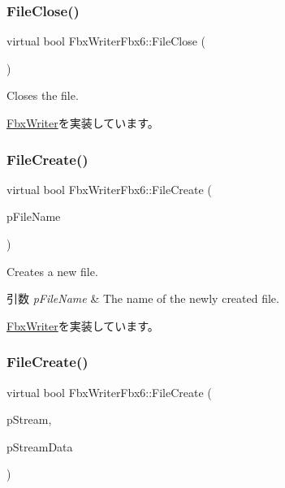 \subsubsection{\texorpdfstring{File\+Close()}{FileClose()}}
{\footnotesize\ttfamily virtual bool Fbx\+Writer\+Fbx6\+::\+File\+Close (\begin{DoxyParamCaption}{ }\end{DoxyParamCaption})\hspace{0.3cm}{\ttfamily [virtual]}}

Closes the file. 

\hyperlink{class_fbx_writer_a0387142f55d0020fd5360759c12aa121}{Fbx\+Writer}を実装しています。

\mbox{\label{class_fbx_writer_fbx6_ae7ad665b515f5896f2263cce0e5f38fc}} 
\subsubsection{\texorpdfstring{File\+Create()}{FileCreate()}\hspace{0.1cm}{\footnotesize\ttfamily [1/2]}}
{\footnotesize\ttfamily virtual bool Fbx\+Writer\+Fbx6\+::\+File\+Create (\begin{DoxyParamCaption}\item[{char $\ast$}]{p\+File\+Name }\end{DoxyParamCaption})\hspace{0.3cm}{\ttfamily [virtual]}}

Creates a new file. 
\begin{DoxyParams}{引数}
{\em p\+File\+Name} & The name of the newly created file. \\
\hline
\end{DoxyParams}


\hyperlink{class_fbx_writer_abe6729227cd6e3be5ee3ab0c1b8b0eda}{Fbx\+Writer}を実装しています。

\mbox{\label{class_fbx_writer_fbx6_a57ad09a9ed4651fee6979cf95c7d4f62}} 
\subsubsection{\texorpdfstring{File\+Create()}{FileCreate()}\hspace{0.1cm}{\footnotesize\ttfamily [2/2]}}
{\footnotesize\ttfamily virtual bool Fbx\+Writer\+Fbx6\+::\+File\+Create (\begin{DoxyParamCaption}\item[{\hyperlink{class_fbx_stream}{Fbx\+Stream} $\ast$}]{p\+Stream,  }\item[{void $\ast$}]{p\+Stream\+Data }\end{DoxyParamCaption})\hspace{0.3cm}{\ttfamily [virtual]}}

